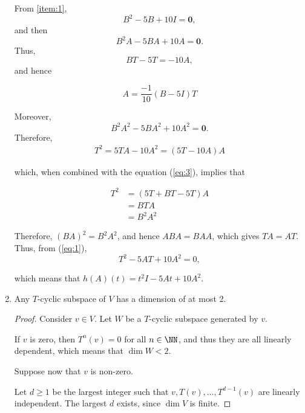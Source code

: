 \documentclass[11pt]{scrartcl}
\begin{document}
\begin{enumerate}[label=\alph*)]
  From \ref{item:1},
  \begin{equation}
    \label{eq:2}
    B^2-5B + 10I = \mathbf{0},
  \end{equation}
  and then
  \begin{equation}
    B^2A - 5 BA + 10A = \mathbf{0}.
  \end{equation}
  Thus,
  \begin{equation*}
    BT-5T = -10A,
  \end{equation*}
  and hence

  \begin{equation}
    \label{eq:3}
    A = \frac{-1}{10}(B-5I)T
  \end{equation}


  Moreover,
  \begin{equation}
    B^2A^2-5BA^2+10A^2=\mathbf{0}.
  \end{equation}
  Therefore,
  \begin{align}
    \label{eq:1}
    T^2=5TA-10A^2 = (5T-10A)A
  \end{align}


  which, when combined with the equation (\ref{eq:3}),
  implies that

  \begin{align}
    T^2 & = (5T +BT-5T)A \\
        & =BTA           \\
        & =B^{2}A^{2}
  \end{align}

  Therefore, $(BA)^2 = B^2A^2$, and hence $ABA = BAA$, which gives
  $TA = AT$. Thus, from (\ref{eq:1}),
  \begin{equation*}
    T^2-5AT+10A^2=0,
  \end{equation*}

  which means that $h(A)(t) = t^2I-5At+10A^{2}$.
\item
  \begin{claim*} Any $T$-cyclic subspace of $V$ has a dimension of
    at most 2.
  \end{claim*}
  \begin{proof}

    Consider $v\in V$. Let $W$ be a $T$-cyclic subspace generated by
    $v$.

    If $v$ is zero, then $T^n(v) = 0$ for all $n\in \NN$, and thus they
    are all linearly dependent, which means that $\dim W < 2$.

    Suppose now that $v$ is non-zero.

    Let $d \geq 1$ be the largest integer such that
    $v, T(v), \dots, T^{d-1}(v)$ are linearly independent.  The largest
    $d$ exists, since $\dim V$ is finite.


\end{proof}
\end{enumerate}
\end{document}
